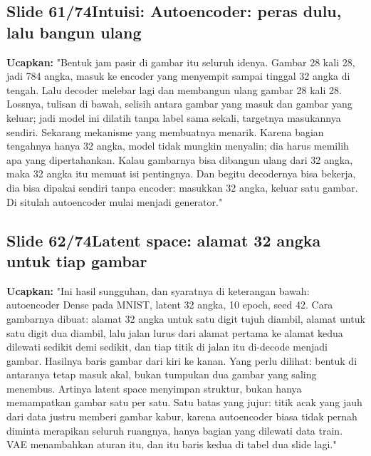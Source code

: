 \documentclass[11pt]{article}
\renewcommand{\framebox}[1]{\colorbox{acc!15}{\textcolor{acc}{\textbf{#1}}}}
\begin{document}
\subsection*{\framebox{Slide 61/74}\quad Intuisi: Autoencoder: peras dulu, lalu bangun ulang}
\textbf{Ucapkan:} "Bentuk jam pasir di gambar itu seluruh idenya. Gambar 28 kali 28, jadi 784 angka, masuk ke encoder yang menyempit sampai tinggal 32 angka di tengah. Lalu decoder melebar lagi dan membangun ulang gambar 28 kali 28. Lossnya, tulisan di bawah, selisih antara gambar yang masuk dan gambar yang keluar; jadi model ini dilatih tanpa label sama sekali, targetnya masukannya sendiri. Sekarang mekanisme yang membuatnya menarik. Karena bagian tengahnya hanya 32 angka, model tidak mungkin menyalin; dia harus memilih apa yang dipertahankan. Kalau gambarnya bisa dibangun ulang dari 32 angka, maka 32 angka itu memuat isi pentingnya. Dan begitu decodernya bisa bekerja, dia bisa dipakai sendiri tanpa encoder: masukkan 32 angka, keluar satu gambar. Di situlah autoencoder mulai menjadi generator."\\[2pt]

\subsection*{\framebox{Slide 62/74}\quad Latent space: alamat 32 angka untuk tiap gambar}
\textbf{Ucapkan:} "Ini hasil sungguhan, dan syaratnya di keterangan bawah: autoencoder Dense pada MNIST, latent 32 angka, 10 epoch, seed 42. Cara gambarnya dibuat: alamat 32 angka untuk satu digit tujuh diambil, alamat untuk satu digit dua diambil, lalu jalan lurus dari alamat pertama ke alamat kedua dilewati sedikit demi sedikit, dan tiap titik di jalan itu di-decode menjadi gambar. Hasilnya baris gambar dari kiri ke kanan. Yang perlu dilihat: bentuk di antaranya tetap masuk akal, bukan tumpukan dua gambar yang saling menembus. Artinya latent space menyimpan struktur, bukan hanya memampatkan gambar satu per satu. Satu batas yang jujur: titik acak yang jauh dari data justru memberi gambar kabur, karena autoencoder biasa tidak pernah diminta merapikan seluruh ruangnya, hanya bagian yang dilewati data train. VAE menambahkan aturan itu, dan itu baris kedua di tabel dua slide lagi."\\[2pt]
\end{document}
